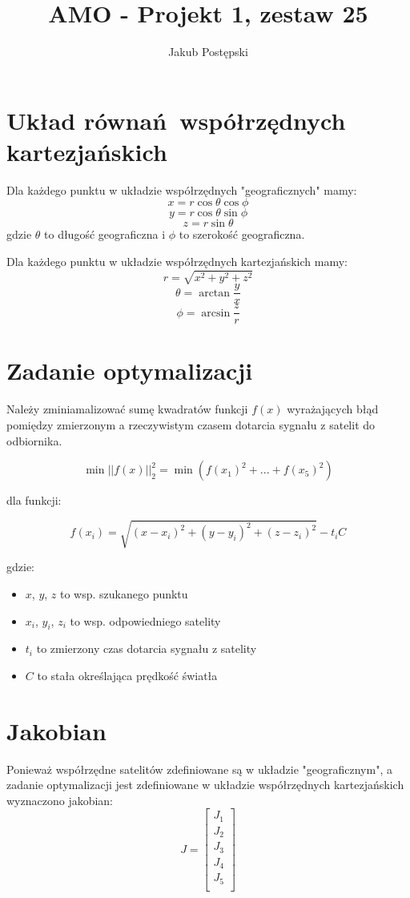 \documentclass[]{article}
\title{AMO - Projekt 1, zestaw 25}
\author{Jakub Postępski}
\begin{document}
\maketitle


\section{Układ równań współrzędnych kartezjańskich}
Dla każdego punktu w układzie współrzędnych "geograficznych" mamy:
\[ x = r\cos \theta \cos \phi \]
\[ y = r\cos \theta \sin \phi \]
\[ z = r\sin \theta \]
gdzie $ \theta $ to długość geograficzna i $ \phi $ to szerokość geograficzna.

Dla każdego punktu w układzie współrzędnych kartezjańskich mamy:
\[ r = \sqrt{x^2 + y^2 + z^2}\]
\[ \theta = \arctan \frac{y}{x} \]
\[ \phi = \arcsin \frac{z}{r} \]


\section{Zadanie optymalizacji}
Należy zminiamalizować sumę kwadratów funkcji $f(x)$ wyrażających błąd pomiędzy zmierzonym a rzeczywistym czasem dotarcia sygnału z satelit do odbiornika.

\[ \min || f(x) ||^2_2 = \min (f(x_1)^2 + ... + f(x_5)^2)\]

dla funkcji:

\[ f(x_i) = \sqrt{(x-x_i)^2 + (y-y_i)^2 + (z-z_i)^2}-t_iC\]

gdzie: 
\begin{itemize}
	\item $x$, $y$, $z$ to wsp. szukanego punktu
	\item $x_i$, $y_i$, $z_i$ to wsp. odpowiedniego satelity
	\item $t_i$ to zmierzony czas dotarcia sygnału z satelity
	\item $C$ to stała określająca prędkość światła
\end{itemize}

\section{Jakobian}
Ponieważ współrzędne satelitów zdefiniowane są w układzie "geograficznym", a zadanie optymalizacji jest zdefiniowane w układzie współrzędnych kartezjańskich wyznaczono jakobian:
\[J = \begin{bmatrix}
J_1\\
J_2\\
J_3\\
J_4\\
J_5\\
\end{bmatrix}\]
\end{document}
